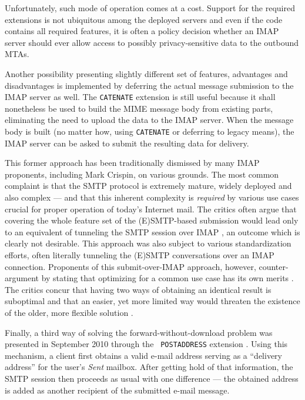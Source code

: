 \documentclass[trojita]{subfiles}
\begin{document}
Unfortunately, such mode of operation comes at a cost.  Support for the required extensions is not
ubiquitous among the deployed servers and even if the code contains all required features, it is often a policy decision
whether an IMAP server should ever allow access to possibly privacy-sensitive data to the outbound MTAs.

Another possibility presenting slightly different set of features, advantages and disadvantages is implemented by
deferring the actual message submission to the IMAP server as well.  The {\tt CATENATE} extension is still useful
because it shall nonetheless be used to build the MIME message body from existing parts, eliminating the need to upload
the data to the IMAP server.  When the message body is built (no matter how, using {\tt CATENATE} or deferring to legacy
means), the IMAP server can be asked to submit the resulting data for delivery.

This former approach has been traditionally dismissed by many IMAP proponents, including Mark Crispin, on various
grounds.  The most common complaint is that the SMTP protocol is extremely mature, widely deployed and also complex ---
and that this inherent complexity is {\em required} by various use cases crucial for proper operation of today's
Internet mail.  The critics often argue that covering the whole feature set of the (E)SMTP-based submission would lead
only to an equivalent of tunneling the SMTP session over IMAP \cite{crispin-smtp-tunneling}
\cite{cridland-imap-submission-sendmail-not-enough}, an outcome which is clearly not desirable.  This approach was
also subject to various standardization efforts, often literally tunneling the (E)SMTP conversations \cite[p.
30]{draft-maes-lemonade-p-imap} over an IMAP connection.  Proponents of this submit-over-IMAP approach, however,
counter-argument by stating that optimizing for a common use case has its own merits
\cite{brong-common-sendmail-makes-sense}.  The critics concur that having two ways of obtaining an identical result is
suboptimal and that an easier, yet more limited way would threaten the existence of the older, more flexible solution
\cite{crispin-submission-would-kill-smtp}.

Finally, a third way of solving the forward-without-download problem was presented in September 2010 through the {\tt
POSTADDRESS} extension \cite{draft-melnikov-imap-postaddress}.  Using this mechanism, a client first obtains a valid
e-mail address serving as a ``delivery address'' for the user's {\em Sent} mailbox.  After getting hold of that
information, the SMTP session then proceeds as usual with one difference --- the obtained address is added as another
recipient of the submitted e-mail message.
\end{document}
